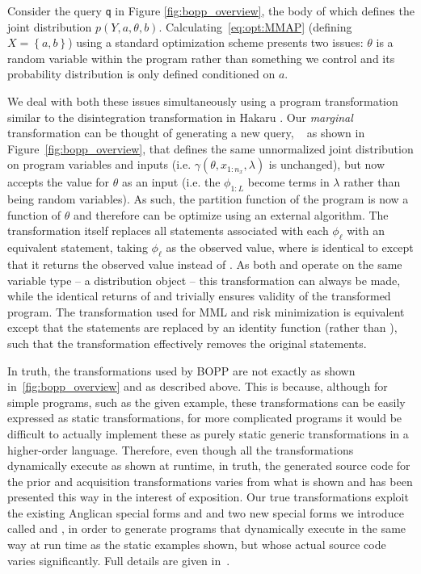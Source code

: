 
Consider the  query \texttt{q} in Figure \ref{fig:bopp_overview}, the body of which defines the joint distribution $p\left(Y,a,\theta,b\right)$.   Calculating~\eqref{eq:opt:MMAP} (defining $X=\left\{a,b\right\}$) using a standard optimization scheme presents two issues: $\theta$ is a random variable within the program rather than something we control and its probability distribution is only defined conditioned on $a$.

We deal with both these issues simultaneously using a program transformation similar to the disintegration transformation in Hakaru \citep{zinkov2016composing}. Our \emph{marginal} transformation can be thought of generating a new query, \qmarg~ as shown in Figure~\ref{fig:bopp_overview}, that defines the same unnormalized joint distribution on program variables and inputs (i.e. $\gamma(\theta,x_{1:n_x},\lambda)$ is unchanged), but now accepts the value for $\theta$ as an input (i.e. the $\phi_{1:L}$ become terms in $\lambda$ rather than being random variables).  As such, the partition function of the program is
now a function of $\theta$ and therefore can be optimize using an external algorithm.
The transformation itself replaces all \sample statements associated with each $\phi_{\ell}$ with an equivalent \observes statement, taking $\phi_{\ell}$ as the observed value, where \observes is identical to \observe except that it returns the observed value instead of .  As both \sample and \observe operate on the same variable type -- a distribution object -- this transformation can always be made, while the identical returns of \sample and \observes trivially ensures validity of the transformed program.  The transformation used for MML and risk
minimization
is equivalent except that the \observe statements are replaced by an identity function (rather than \observes), such
that the transformation effectively removes the original \sample statements.

In truth, the transformations used by BOPP are not exactly as shown in~\ref{fig:bopp_overview}
and as described above.  This is because, although for simple programs, such as the given
example, these transformations can be easily expressed as static transformations, for more
complicated programs it would be difficult to actually implement these as purely static
generic transformations in a higher-order language.  Therefore, even though all the
transformations dynamically execute as shown at runtime, in truth, the generated source 
code for the prior and acquisition transformations varies from what is shown and has 
been presented this way in the interest of exposition.  Our true transformations exploit
the existing Anglican special forms  and  and two new
special forms we introduce called  and , in order to generate programs
that dynamically execute in the same way at run time as the static examples shown, but
whose actual source code varies significantly.  Full details are given in~\cite{rainforth2017boppArxiv}.

